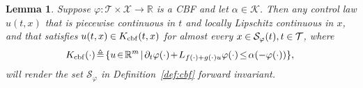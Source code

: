 \documentclass[10pt,conference]{ieeeconf}
\renewcommand{\(}{\left(}
\renewcommand{\)}{\right)}
\renewcommand{\[}{\left[}
\renewcommand{\]}{\right]}
\newcommand{\reals}{\mathbb{R}}
\newtheorem{lemma}{Lemma}
\begin{document}
\begin{lemma}%
\label{prior:cbf_invariance}
Suppose ${\varphi}:\mathcal{T}\times\mathcal{X}\rightarrow \reals$ is a CBF and let $\alpha\in\mathcal{K}$. 
Then any control law $u(t,x)$ that is piecewise continuous in $t$ and locally Lipschitz continuous in $x$, and that satisfies $u(t,x) \hspace{-0.4pt}\in\hspace{-0.4pt} K_\textnormal{\textrm{cbf}}(t,x)$ for almost every $x\hspace{-0.4pt}\in\hspace{-0.4pt}\mathcal{S}_\varphi(t), t\hspace{-0.4pt}\in\hspace{-0.4pt}\mathcal{T}$, where 
\begin{equation}
    \hspace{-6pt} K_\textnormal{\textrm{cbf}}(\cdot) \hspace{-1.5pt}\triangleq\hspace{-1.5pt} \{ u \hspace{-1.5pt}\in\hspace{-1.5pt} \reals^m \hspace{-1.5pt}\mid\hspace{-1.5pt} \partial_t {\varphi}(\cdot) \hspace{-1.5pt}+\hspace{-1.5pt} L_{f(\cdot) + g(\cdot) u} {\varphi}(\cdot) \hspace{-1.5pt}\leq\hspace{-1.5pt} \alpha(-{\varphi}(\cdot)) \},\hspace{-4pt} \label{eq:cbf_condition}
\end{equation}
will render the set 
{$\mathcal{S}_\varphi$ in Definition~\ref{def:cbf}}
forward invariant.
\end{lemma}
\end{document}

